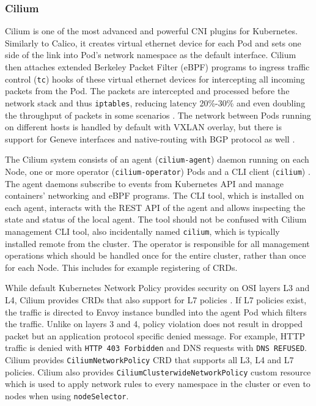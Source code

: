 \documentclass[english, 12pt, a4paper, sci, utf8, a-2b, online]{aaltothesis}
\begin{document}
\subsubsection{Cilium}

Cilium \cite{cilium} is one of the most advanced and powerful CNI plugins for Kubernetes. Similarly to Calico, it creates virtual ethernet device for each Pod and sets one side of the link into Pod's network namespace \cite{cilium-tkng} as the default interface. Cilium then attaches extended Berkeley Packet Filter (eBPF) programs to ingress traffic control (\texttt{tc}) hooks of these virtual ethernet devices for intercepting all incoming packets from the Pod. The packets are intercepted and processed before the network stack and thus \texttt{iptables}, reducing latency 20\%-30\% and even doubling the throughput of packets in some scenarios \cite{budigiri2021network}. The network between Pods running on different hosts is handled by default with VXLAN overlay, but there is support for Geneve interfaces and native-routing with BGP protocol as well \cite{cilium}.

The Cilium system consists of an agent (\texttt{cilium-agent}) daemon running on each Node, one or more operator (\texttt{cilium-operator}) Pods and a CLI client (\texttt{cilium}) \cite{cilium-components}. The agent daemons subscribe to events from Kubernetes API and manage containers' networking and eBPF programs. The CLI tool, which is installed on each agent, interacts with the REST API of the agent and allows inspecting the state and status of the local agent. The tool should not be confused with Cilium management CLI tool, also incidentally named \texttt{cilium}, which is typically installed remote from the cluster. The operator is responsible for all management operations which should be handled once for the entire cluster, rather than once for each Node. This includes for example registering of CRDs.

While default Kubernetes Network Policy provides security on OSI layers L3 and L4, Cilium provides CRDs that also support for L7 policies \cite{cilium-policy-language}. If L7 policies exist, the traffic is directed to Envoy instance bundled into the agent Pod which filters the traffic. Unlike on layers 3 and 4, policy violation does not result in dropped packet but an application protocol specific denied message. For example, HTTP traffic is denied with \texttt{HTTP 403 Forbidden} and DNS requests with \texttt{DNS REFUSED}. Cilium provides \texttt{CiliumNetworkPolicy} CRD that supports all L3, L4 and L7 policies. Cilium also provides \texttt{CiliumClusterwideNetworkPolicy} custom resource which is used to apply network rules to every namespace in the cluster or even to nodes when using \texttt{nodeSelector}.
\end{document}
